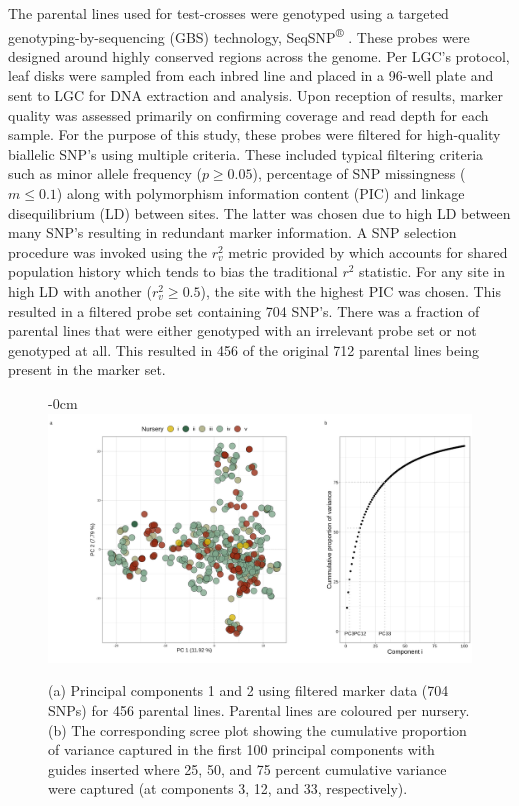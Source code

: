 The parental lines used for test-crosses were genotyped using a targeted genotyping-by-sequencing (GBS) technology, SeqSNP\textsuperscript{®} \cite{LGC2019}. These probes were designed around highly conserved regions across the genome. Per LGC's protocol, leaf disks were sampled from each inbred line and placed in a 96-well plate and sent to LGC for DNA extraction and analysis. Upon reception of results, marker quality was assessed primarily on confirming coverage and read depth for each sample. For the purpose of this study, these probes were filtered for high-quality biallelic SNP's using multiple criteria. These included typical filtering criteria such as minor allele frequency (\(p \ge 0.05\)), percentage of SNP missingness (\(m \le 0.1\)) along with polymorphism information content (PIC) and linkage disequilibrium (LD) between sites. The latter was chosen due to high LD between many SNP's resulting in redundant marker information. A SNP selection procedure was invoked using the \(r^2_v\) metric provided by \cite{Mangin2012} which accounts for shared population history which tends to bias the traditional \(r^2\) statistic.  For any site in high LD with another (\(r^2_v \ge 0.5\)), the site with the highest PIC was chosen. This resulted in a filtered probe set containing 704 SNP's. There was a fraction of parental lines that were either genotyped with an irrelevant probe set or not genotyped at all. This resulted in 456 of the original 712 parental lines being present in the marker set.

\begin{figure}[H]
\begin{adjustwidth}{-\extralength}{0cm}
\centering
\includegraphics[width=15.5cm]{figs_03/1664970293popPca.png}
\end{adjustwidth}
\caption{(a) Principal components 1 and 2 using filtered marker data (704 SNPs) for 456 parental lines. Parental lines are coloured per nursery. (b) The corresponding scree plot showing the cumulative proportion of variance captured in the first 100 principal components with guides inserted where 25, 50, and 75 percent cumulative variance were captured (at components 3, 12, and 33, respectively).}\label{fig:pca}
\end{figure}

